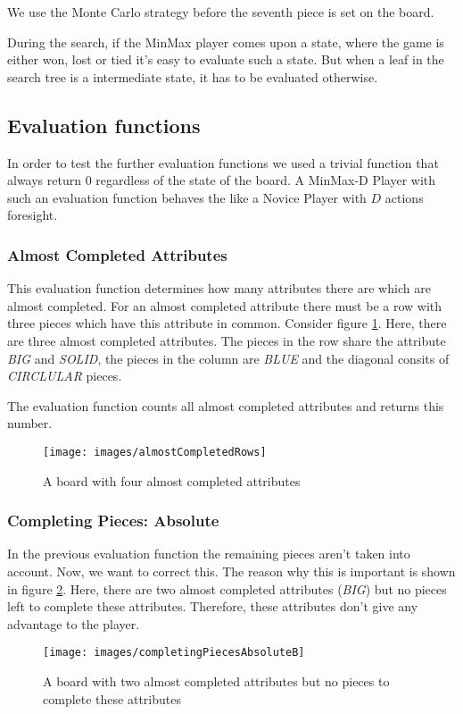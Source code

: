 We use the Monte Carlo strategy before the seventh piece is set on the board.

During the search, if the MinMax player comes upon a state, where the game is either won, lost or tied it's easy to evaluate such a state. But when a leaf in the search tree is a intermediate state, it has to be evaluated otherwise.
\subsection{Evaluation functions}
In order to test the further evaluation functions we used a trivial function that always return 0 regardless of the state of the board. A MinMax-D Player with such an evaluation function behaves the like a Novice Player with $D$ actions foresight.
\subsubsection*{Almost Completed Attributes}
This evaluation function determines how many attributes there are which are almost completed. For an almost completed attribute there must be a row with three pieces which have this attribute in common. Consider figure \ref{fig:almostCompletedRows}. Here, there are three almost completed attributes. The pieces in the row share the attribute \emph{BIG} and \emph{SOLID}, the pieces in the column are \emph{BLUE} and the diagonal consits of \emph{CIRCLULAR} pieces.

The evaluation function counts all almost completed attributes and returns this number.
\begin{figure}[h]
  \centering
  \texttt{[image: images/almostCompletedRows]}
  \caption{A board with four almost completed attributes}
  \label{fig:almostCompletedRows}
\end{figure}
\subsubsection*{Completing Pieces: Absolute}
In the previous evaluation function the remaining pieces aren't taken into account. Now, we want to correct this. The reason why this is important is shown in figure \ref{fig:completingPiecesAbsoluteB}. Here, there are two almost completed attributes (\emph{BIG}) but no pieces left to complete these attributes. Therefore, these attributes don't give any advantage to the player.
\begin{figure}[h]
  \centering
  \texttt{[image: images/completingPiecesAbsoluteB]}
  \caption{A board with two almost completed attributes but no pieces to complete these attributes}
  \label{fig:completingPiecesAbsoluteB}
\end{figure}

